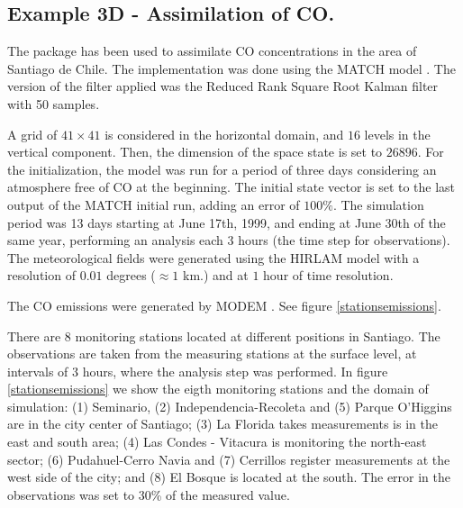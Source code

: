 \documentclass[12pt]{article}
\begin{document}
\subsection{Example 3D - Assimilation of CO.}
The package has been used to assimilate CO concentrations in the area of Santiago de Chile. The implementation was done using the MATCH model \cite{MATCHmodel}. The version of the filter applied was the Reduced Rank Square Root Kalman filter with 50 samples. 

A grid of $41 \times 41$ is considered in the horizontal domain, and $16$ levels in the vertical component. Then, the dimension of the space state is set to $26896$. For the initialization, the model was run for a period of three days considering an atmosphere free of CO at the beginning. The initial state vector is set to the last output of the MATCH initial run, adding an error of $100\%$. The simulation period was 13 days starting at June 17th, 1999, and ending at June 30th of the same year, performing an analysis each $3$ hours (the time step for observations). The meteorological fields were generated using the HIRLAM model \cite{HIRLAMmodel} with a resolution of $0{.}01$ degrees ($\approx 1$ km.) and at $1$ hour of time resolution. 

The CO emissions were generated by MODEM \cite{MODEMmodel}. See figure \ref{stationsemissions}.

There are 8 monitoring stations located at different positions in Santiago. The observations are taken from the measuring stations at the surface level, at intervals of $3$ hours, where the analysis step was performed. In figure \ref{stationsemissions} we show the eigth monitoring stations and the domain of simulation: (1) Seminario, (2) Independencia-Recoleta and (5) Parque O’Higgins are in the city center of Santiago; (3) La Florida takes measurements is in the east and south area; (4) Las Condes - Vitacura is monitoring the north-east sector; (6) Pudahuel-Cerro Navia and (7) Cerrillos register measurements at the west side of the city; and (8) El Bosque is located at the south. The error in the observations was set to 30\% of the measured value.
\end{document}
